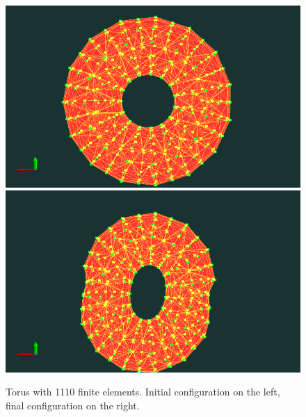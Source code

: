 \documentclass[en]{minipw} %
\begin{document}
\begin{figure}[h!]
\centering
\includegraphics[scale=0.3]{pictures/tests/1119.png}
\includegraphics[scale=0.3]{pictures/tests/1119_end.png}
\caption[Torus with 1110 finite elements]{Torus with 1110 finite elements. Initial configuration on the left, final configuration on the right.}
\label{fig:torus1110}
\end{figure}
\end{document}
